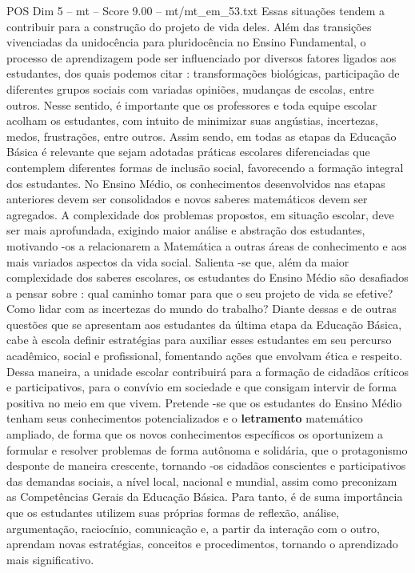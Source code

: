 \begin{textsample}{POS Dim 5 – mt – Score 9.00 – mt/mt\_em\_53.txt}
Essas situações tendem a contribuir para a construção do projeto de vida deles.
Além das transições vivenciadas da unidocência para pluridocência no Ensino Fundamental, o processo de aprendizagem pode ser influenciado por diversos fatores ligados aos estudantes, dos quais podemos citar : transformações biológicas, participação de diferentes grupos sociais com variadas opiniões, mudanças de escolas, entre outros.
Nesse sentido, é importante que os professores e toda equipe escolar acolham os estudantes, com intuito de minimizar suas angústias, incertezas, medos, frustrações, entre outros.
Assim sendo, em todas as etapas da Educação Básica é relevante que sejam adotadas práticas escolares diferenciadas que contemplem diferentes formas de inclusão social, favorecendo a formação integral dos estudantes.
No Ensino Médio, os conhecimentos desenvolvidos nas etapas anteriores devem ser consolidados e novos saberes matemáticos devem ser agregados.
A complexidade dos problemas propostos, em situação escolar, deve ser mais aprofundada, exigindo maior análise e abstração dos estudantes, motivando -os a relacionarem a Matemática a outras áreas de conhecimento e aos mais variados aspectos da vida social.
Salienta -se que, além da maior complexidade dos saberes escolares, os estudantes do Ensino Médio são desafiados a pensar sobre : qual caminho tomar para que o seu projeto de vida se efetive?
Como lidar com as incertezas do mundo do trabalho?
Diante dessas e de outras questões que se apresentam aos estudantes da última etapa da Educação Básica, cabe à escola definir estratégias para auxiliar esses estudantes em seu percurso acadêmico, social e profissional, fomentando ações que envolvam ética e respeito.
Dessa maneira, a unidade escolar contribuirá para a formação de cidadãos críticos e participativos, para o convívio em sociedade e que consigam intervir de forma positiva no meio em que vivem.
Pretende -se que os estudantes do Ensino Médio tenham seus conhecimentos potencializados e o \textbf{letramento} matemático ampliado, de forma que os novos conhecimentos específicos os oportunizem a formular e resolver problemas de forma autônoma e solidária, que o protagonismo desponte de maneira crescente, tornando -os cidadãos conscientes e participativos das demandas sociais, a nível local, nacional e mundial, assim como preconizam as Competências Gerais da Educação Básica.
Para tanto, é de suma importância que os estudantes utilizem suas próprias formas de reflexão, análise, argumentação, raciocínio, comunicação e, a partir da interação com o outro, aprendam novas estratégias, conceitos e procedimentos, tornando o aprendizado mais significativo.

\end{textsample}
